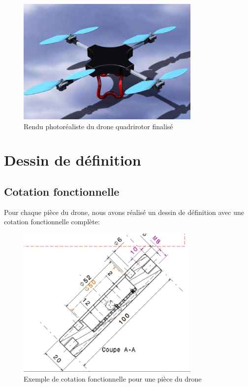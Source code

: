 \documentclass[a4paper,12pt]{report}
\begin{document}
\begin{figure}[H]
    \centering
    \includegraphics[width=0.8\textwidth]{images/drone_apercu.png}
    \caption{Rendu photoréaliste du drone quadrirotor finalisé}
    \label{fig:rendu_final}
\end{figure}

\chapter{Dessin de définition}
\section{Cotation fonctionnelle}
Pour chaque pièce du drone, nous avons réalisé un dessin de définition avec une cotation fonctionnelle complète:

\begin{figure}[H]
    \centering
    \includegraphics[width=0.8\textwidth]{images/exemple_cotation_fonctionnelle.png}
    \caption{Exemple de cotation fonctionnelle pour une pièce du drone}
    \label{fig:exemple_cotation_fonctionnelle}
\end{figure}
\end{document}
